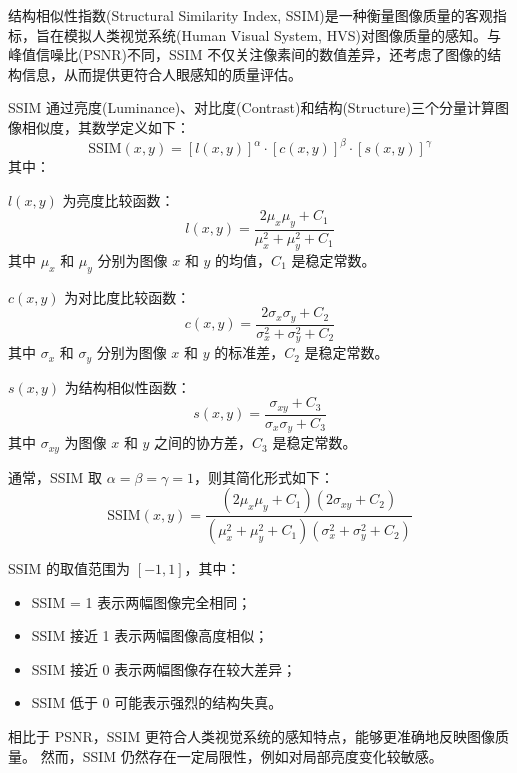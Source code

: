 结构相似性指数(Structural Similarity Index, SSIM)是一种衡量图像质量的客观指标，旨在模拟人类视觉系统(Human Visual System, HVS)对图像质量的感知。与峰值信噪比(PSNR)不同，SSIM 不仅关注像素间的数值差异，还考虑了图像的结构信息，从而提供更符合人眼感知的质量评估。

SSIM 通过亮度(Luminance)、对比度(Contrast)和结构(Structure)三个分量计算图像相似度，其数学定义如下：
\begin{equation}
\text{SSIM}(x, y) = [l(x, y)]^\alpha \cdot [c(x, y)]^\beta \cdot [s(x, y)]^\gamma
\end{equation}
其中：

$l(x, y)$ 为亮度比较函数：
\begin{equation}
l(x, y) = \frac{2\mu_x\mu_y + C_1}{\mu_x^2 + \mu_y^2 + C_1}
\end{equation}
其中 $\mu_x$ 和 $\mu_y$ 分别为图像 $x$ 和 $y$ 的均值，$C_1$ 是稳定常数。

$c(x, y)$ 为对比度比较函数：
\begin{equation}
c(x, y) = \frac{2\sigma_x\sigma_y + C_2}{\sigma_x^2 + \sigma_y^2 + C_2}
\end{equation}
其中 $\sigma_x$ 和 $\sigma_y$ 分别为图像 $x$ 和 $y$ 的标准差，$C_2$ 是稳定常数。

$s(x, y)$ 为结构相似性函数：
\begin{equation}
s(x, y) = \frac{\sigma_{xy} + C_3}{\sigma_x \sigma_y + C_3}
\end{equation}
其中 $\sigma_{xy}$ 为图像 $x$ 和 $y$ 之间的协方差，$C_3$ 是稳定常数。


通常，SSIM 取 $\alpha = \beta = \gamma = 1$，则其简化形式如下：
\begin{equation}
    \text{SSIM}(x, y) = \frac{(2\mu_x\mu_y + C_1)(2\sigma_{xy} + C_2)}{(\mu_x^2 + \mu_y^2 + C_1)(\sigma_x^2 + \sigma_y^2 + C_2)}
\end{equation}

SSIM 的取值范围为 $[-1,1]$，其中：
\begin{itemize}
    \item SSIM = 1 表示两幅图像完全相同；
    \item SSIM 接近 1 表示两幅图像高度相似；
    \item SSIM 接近 0 表示两幅图像存在较大差异；
    \item SSIM 低于 0 可能表示强烈的结构失真。
\end{itemize}

相比于 PSNR，SSIM 更符合人类视觉系统的感知特点，能够更准确地反映图像质量。
然而，SSIM 仍然存在一定局限性，例如对局部亮度变化较敏感。

